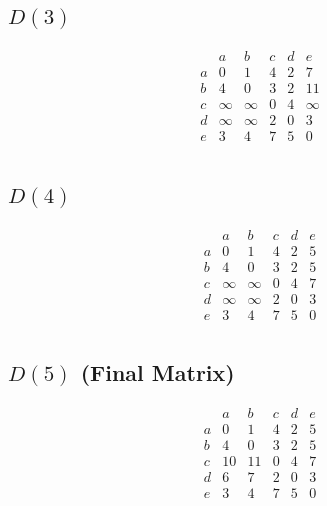 \documentclass{article}
\begin{document}
\subsection*{\( D(3) \)}
\[
\begin{matrix}
  & a & b & c & d & e \\
a & 0 & 1 & 4 & 2 & 7 \\
b & 4 & 0 & 3 & 2 & 11 \\
c & \infty & \infty & 0 & 4 & \infty \\
d & \infty & \infty & 2 & 0 & 3 \\
e & 3 & 4 & 7 & 5 & 0 \\
\end{matrix}
\]

\subsection*{\( D(4) \)}
\[
\begin{matrix}
  & a & b & c & d & e \\
a & 0 & 1 & 4 & 2 & 5 \\
b & 4 & 0 & 3 & 2 & 5 \\
c & \infty & \infty & 0 & 4 & 7 \\
d & \infty & \infty & 2 & 0 & 3 \\
e & 3 & 4 & 7 & 5 & 0 \\
\end{matrix}
\]

\subsection*{\( D(5) \) (Final Matrix)}
\[
\begin{matrix}
  & a & b & c & d & e \\
a & 0 & 1 & 4 & 2 & 5 \\
b & 4 & 0 & 3 & 2 & 5 \\
c & 10 & 11 & 0 & 4 & 7 \\
d & 6 & 7 & 2 & 0 & 3 \\
e & 3 & 4 & 7 & 5 & 0 \\
\end{matrix}
\]
\end{document}
